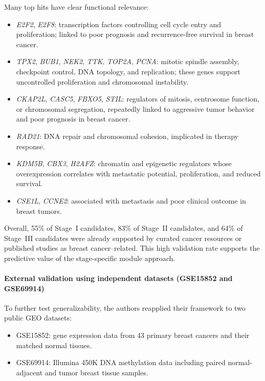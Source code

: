 \documentclass[10pt]{extarticle}
\begin{document}
Many top hits have clear functional relevance:
\begin{itemize}[label=-]
    \item \textit{E2F2}, \textit{E2F8}: transcription factors controlling cell cycle entry and proliferation; linked to poor prognosis and recurrence-free survival in breast cancer.
    \item \textit{TPX2}, \textit{BUB1}, \textit{NEK2}, \textit{TTK}, \textit{TOP2A}, \textit{PCNA}: mitotic spindle assembly, checkpoint control, DNA topology, and replication; these genes support uncontrolled proliferation and chromosomal instability.
    \item \textit{CKAP2L}, \textit{CASC5}, \textit{FBXO5}, \textit{STIL}: regulators of mitosis, centrosome function, or chromosomal segregation, repeatedly linked to aggressive tumor behavior and poor prognosis in breast cancer.
    \item \textit{RAD21}: DNA repair and chromosomal cohesion, implicated in therapy response.
    \item \textit{KDM5B}, \textit{CBX3}, \textit{H2AFZ}: chromatin and epigenetic regulators whose overexpression correlates with metastatic potential, proliferation, and reduced survival.
    \item \textit{CSE1L}, \textit{CCNE2}: associated with metastasis and poor clinical outcome in breast tumors.
\end{itemize}

Overall, 55\% of Stage~I candidates, 83\% of Stage~II candidates, and 64\% of Stage~III candidates were already supported by curated cancer resources or published studies as breast cancer--related. This high validation rate supports the predictive value of the stage-specific module approach.

\paragraph{External validation using independent datasets (GSE15852 and GSE69914)}
To further test generalizability, the authors reapplied their framework to two public GEO datasets:
\begin{itemize}[label=-]
    \item GSE15852: gene expression data from 43 primary breast cancers and their matched normal tissues.
    \item GSE69914: Illumina 450K DNA methylation data including paired normal-adjacent and tumor breast tissue samples.
\end{itemize}
\end{document}
